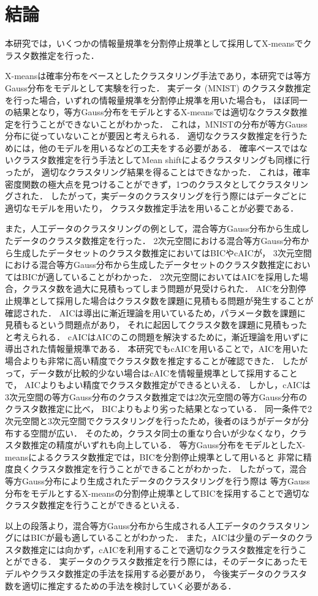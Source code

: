 \section{結論}

本研究では，いくつかの情報量規準を分割停止規準として採用してX-meansでクラスタ数推定を行った．

X-meansは確率分布をベースとしたクラスタリング手法であり，本研究では等方Gauss分布をモデルとして実験を行った．
実データ (MNIST) のクラスタ数推定を行った場合，いずれの情報量規準を分割停止規準を用いた場合も，
ほぼ同一の結果となり，等方Gauss分布をモデルとするX-meansでは適切なクラスタ数推定を行うことができないことがわかった．
これは，MNISTの分布が等方Gauss分布に従っていないことが要因と考えられる．
適切なクラスタ数推定を行うためには，他のモデルを用いるなどの工夫をする必要がある．
確率ベースではないクラスタ数推定を行う手法としてMean shiftによるクラスタリングも同様に行ったが，
適切なクラスタリング結果を得ることはできなかった．
これは，確率密度関数の極大点を見つけることができず，1つのクラスタとしてクラスタリングされた．
したがって，実データのクラスタリングを行う際にはデータごとに適切なモデルを用いたり，
クラスタ数推定手法を用いることが必要である．

また，人工データのクラスタリングの例として，混合等方Gauss分布から生成したデータのクラスタ数推定を行った．
2次元空間における混合等方Gauss分布から生成したデータセットのクラスタ数推定においてはBICやcAICが，
3次元空間における混合等方Gauss分布から生成したデータセットのクラスタ数推定においてはBICが適していることがわかった．
2次元空間においてはAICを採用した場合，クラスタ数を過大に見積もってしまう問題が見受けられた．
AICを分割停止規準として採用した場合はクラスタ数を課題に見積もる問題が発生することが確認された．
AICは導出に漸近理論を用いているため，パラメータ数を課題に見積もるという問題点があり，
それに起因してクラスタ数を課題に見積もったと考えられる．
cAICはAICのこの問題を解決するために，漸近理論を用いずに導出された情報量規準である．
本研究でもcAICを用いることで，AICを用いた場合よりも非常に高い精度でクラスタ数を推定することが確認できた．
したがって，データ数が比較的少ない場合はcAICを情報量規準として採用することで，
AICよりもよい精度でクラスタ数推定ができるといえる．
しかし，cAICは3次元空間の等方Gauss分布のクラスタ数推定では2次元空間の等方Gauss分布のクラスタ数推定に比べ，
BICよりもより劣った結果となっている．
同一条件で2次元空間と3次元空間でクラスタリングを行ったため，後者のほうがデータが分布する空間が広い．
そのため，クラスタ同士の重なり合いが少なくなり，クラスタ数推定の精度がいずれも向上している．
等方Gauss分布をモデルとしたX-meansによるクラスタ数推定では，BICを分割停止規準として用いると
非常に精度良くクラスタ数推定を行うことができることがわかった．
したがって，混合等方Gauss分布により生成されたデータのクラスタリングを行う際は
等方Gauss分布をモデルとするX-meansの分割停止規準としてBICを採用することで適切なクラスタ数推定を行うことができるといえる．

以上の段落より，混合等方Gauss分布から生成される人工データのクラスタリングにはBICが最も適していることがわかった．
また，AICは少量のデータのクラスタ数推定には向かず，cAICを利用することで適切なクラスタ数推定を行うことができる．
実データのクラスタ数推定を行う際には，そのデータにあったモデルやクラスタ数推定の手法を採用する必要があり，
今後実データのクラスタ数を適切に推定するための手法を検討していく必要がある．
